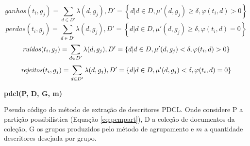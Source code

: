 \begin{equation}
  ganhos(t_i,g_j) = 
  \sum_{
      d \in D' 
  } \lambda(d,g_j), D' = \left\{d | d \in D, \mu'(d,g_j) \geq \delta, \varphi(t_i,d) > 0
  \right\}
  \label{eq:ganhos2}
\end{equation}
\begin{equation}
  perdas(t_i,g_j) = 
  \sum_{
      d \in D' 
  } \lambda(d,g_j), D' = \left\{d | d \in D, \mu'(d,g_j) \geq \delta, \varphi(t_i,d) = 0
  \right\}
  \label{eq:perdas2}
\end{equation}
\begin{equation}
  \text{\it ruídos\/}(t_i,g_j) = 
  \sum_{
      d \in D' 
  } \lambda(d,g_j), D' = \left\{d | d \in D, \mu'(d,g_j) < \delta, \varphi(t_i,d) > 0 \right\}
  \label{eq:ruidos2}
\end{equation}
\begin{equation}
  \text{\it rejeitos\/}(t_i,g_j) = 
  \sum_{
      d \in D' 
  } \lambda(d,g_j), D' = \left\{d | d \in D, \mu'(d,g_j) < \delta, \varphi(t_i,d) = 0 \right\}
  \label{eq:rejeitos2}
\end{equation}

\begin{algorithm}[!htp] 
  \SetAlgoLined 
  \textbf{{\color{blue}pdcl}(P, D, G, m)}\\
  \caption{Pseudo código do método de extração de descritores PDCL. Onde
    considere P a partição
  possibilística (Equação \ref{eq:pcmpart}), D a coleção de documentos da coleção, G os grupos
produzidos pelo método de agrupamento e $m$ a quantidade descritores desejada por grupo.}
\label{alg:pdcl} 
\end{algorithm}

